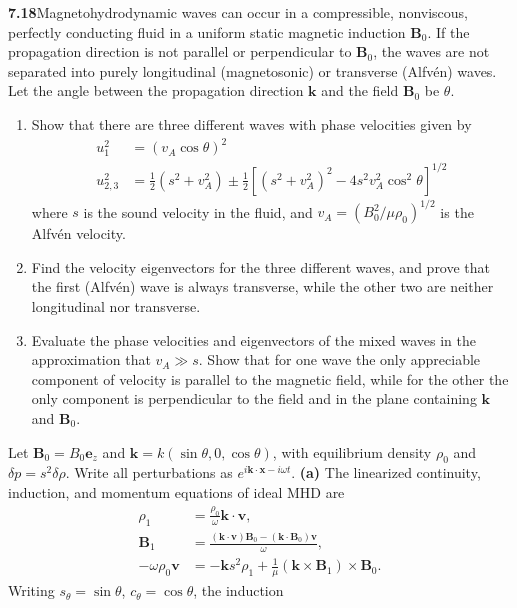 \par\bigskip
\noindent\textbf{7.18}\quad Magnetohydrodynamic waves can occur in a compressible, nonviscous, perfectly conducting fluid in a uniform static magnetic induction $\mathbf{B}_{0}$. If the propagation direction is not parallel or perpendicular to $\mathbf{B}_{0}$, the waves are not separated into purely longitudinal (magnetosonic) or transverse (Alfv\'en) waves. Let the angle between the propagation direction $\mathbf{k}$ and the field $\mathbf{B}_{0}$ be $\theta$.
\begin{enumerate}
\item[(a)] Show that there are three different waves with phase velocities given by
\begin{align*}
u_{1}^{2}&=(v_{A}\cos\theta)^{2}\\
u_{2,3}^{2}&=\tfrac{1}{2}(s^{2}+v_{A}^{2})\pm\tfrac{1}{2}[(s^{2}+v_{A}^{2})^{2}-4s^{2}v_{A}^{2}\cos^{2}\theta]^{1/2}
\end{align*}
where $s$ is the sound velocity in the fluid, and $v_{A}=(B_{0}^{2}/\mu\rho_{0})^{1/2}$ is the Alfv\'en velocity.
\item[(b)] Find the velocity eigenvectors for the three different waves, and prove that the first (Alfv\'en) wave is always transverse, while the other two are neither longitudinal nor transverse.
\item[(c)] Evaluate the phase velocities and eigenvectors of the mixed waves in the approximation that $v_{A}\gg s$. Show that for one wave the only appreciable component of velocity is parallel to the magnetic field, while for the other the only component is perpendicular to the field and in the plane containing $\mathbf{k}$ and $\mathbf{B}_{0}$.
\end{enumerate}
\solution
Let $\mathbf B_0=B_0\mathbf e_z$ and
$\mathbf k=k(\sin\theta,0,\cos\theta)$, with equilibrium density
$\rho_0$ and $\delta p=s^2\delta\rho$. Write all perturbations as
$e^{i\mathbf k\cdot\mathbf x-i\omega t}$.
\textbf{(a)} The linearized continuity, induction, and momentum
equations of ideal MHD are
\begin{align*}
\rho_1&=\frac{\rho_0}{\omega}\mathbf k\cdot\mathbf v,\\
\mathbf B_1&=\frac{(\mathbf k\cdot\mathbf v)\mathbf B_0
-(\mathbf k\cdot\mathbf B_0)\mathbf v}{\omega},\\
-\omega\rho_0\mathbf v&=-\mathbf k s^2\rho_1
+\frac1\mu(\mathbf k\times\mathbf B_1)\times\mathbf B_0.
\end{align*}
Writing $s_\theta=\sin\theta$, $c_\theta=\cos\theta$, the induction
